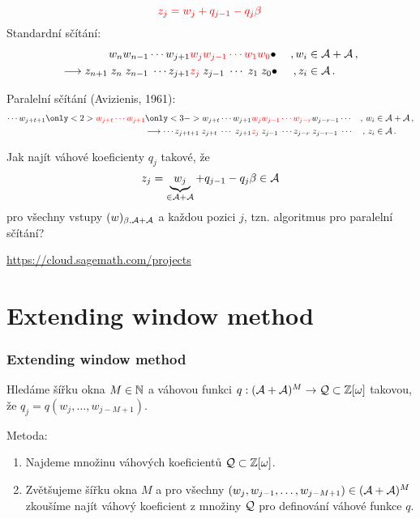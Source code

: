 \documentclass[11pt]{beamer}
\begin{document}
\begin{frame}
    $$
        \textcolor{red}{z_j=w_j + q_{j-1} - q_j \beta}\,
    $$
  Standardní sčítání:%
  \begin{align*}
    w_n w_{n-1}\cdots w_{j+1}& \textcolor{red}{w_j w_{j-1} \cdots w_1 w_0}\bullet& \,,w_i &\in \mathcal{A}+\mathcal{A}\,,    \\
    \longrightarrow z_{n+1}\; z_{n}\; z_{n-1}\;\cdots z_{j+1} &\textcolor{red}{z_j} \; z_{j-1}\; \cdots \;z_1 \; z_0\bullet& \,,z_i &\in \mathcal{A}\,.
  \end{align*}
    
  \pause 
   Paralelní sčítání (Avizienis, 1961):
  \begin{align*}
    \cdots w_{j+t+1}\only<2>{\textcolor{red}{w_{j+t} \cdots w_{j+1}}} \only<3->{w_{j+t} \cdots w_{j+1}}& \textcolor{red}{w_j w_{j-1} \cdots w_{j-r}}w_{j-r-1} \cdots &,\, w_i &\in \A + \A\,,    \\
    \longrightarrow \cdots z_{j+t+1}\;z_{j+t} \; \cdots \; z_{j+1} &\textcolor{red}{z_j} \; z_{j-1}\; \cdots z_{j-r}\;z_{j-r-1}\; \cdots &,\, z_i &\in \A\,.
  \end{align*}

    
\end{frame}

\begin{frame}
Jak najít váhové koeficienty $q_j$ takové, že 
    $$
        z_j=\underbrace{w_j}_{\in \mathcal{A} +\mathcal{A}} + q_{j-1} - q_j \beta \in \mathcal{A} 
    $$
    pro všechny vstupy $(w)_{\beta,\mathcal{A}+\mathcal{A}}$ a každou pozici $j$,
    tzn. algoritmus pro paralelní sčítání?
    
    \rule{0cm}{0cm}
    
     \url{https://cloud.sagemath.com/projects}
\end{frame}


\section{Extending window method}
\begin{frame}
    \frametitle{Extending window method}
    
    Hledáme šířku okna $M \in \mathbb{N}$ a váhovou funkci $q:(\mathcal{A}+\mathcal{A})^{M} \rightarrow \mathcal{Q} \subset \mathbb{Z}[\omega]$ takovou, že $q_j=q(w_j, \dots, w_{j-M+1})$.
        
    \pause
    \vspace{20pt}
    Metoda:
    \begin{enumerate}
        \item Najdeme množinu váhových koeficientů $\mathcal{Q} \subset \mathbb{Z}[\omega]$.
        \item Zvětšujeme šířku okna $M$ a pro všechny $(w_j,w_{j-1}, \dots , w_{j-M+1}) \in (\mathcal{A}+\mathcal{A})^{M}$ zkoušíme najít váhový koeficient z množiny $\mathcal{Q}$ pro definování váhové funkce $q$.
    \end{enumerate}
\end{frame}
\end{document}
